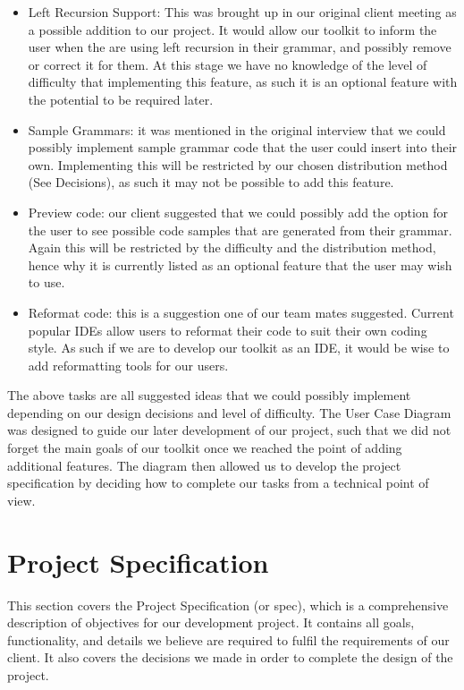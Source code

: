 \begin {itemize}
	\item Left Recursion Support: This was brought up in our original client meeting as a possible addition to our project. It would allow our toolkit to inform the user when the are using left recursion in their grammar, and possibly remove or correct it for them. At this stage we have no knowledge of the level of difficulty that implementing this feature, as such it is an optional feature with the potential to be required later.
	\item Sample Grammars: it was mentioned in the original interview that we could possibly implement sample grammar code that the user could insert into their own. Implementing this will be restricted by our chosen distribution method (See Decisions), as such it may not be possible to add this feature.
	\item Preview code: our client suggested that we could possibly add the option for the user to see possible code samples that are generated from their grammar. Again this will be restricted by the difficulty and the distribution method, hence why it is currently listed as an optional feature that the user may wish to use.
	\item Reformat code: this is a suggestion one of our team mates suggested. Current popular IDEs allow users to reformat their code to suit their own coding style. As such if we are to develop our toolkit as an IDE, it would be wise to add reformatting tools for our users.
\end {itemize}

The above tasks are all suggested ideas that we could possibly implement depending on our design decisions and level of difficulty. The User Case Diagram was designed to guide our later development of our project, such that we did not forget the main goals of our toolkit once we reached the point of adding additional features. The diagram then allowed us to develop the project specification by deciding how to complete our tasks from a technical point of view.

\section{Project Specification}
This section covers the Project Specification (or spec), which is a comprehensive description of objectives for our development project. It contains all goals, functionality, and details we believe are required to fulfil the requirements of our client. It also covers the decisions we made in order to complete the design of the project. \\
\\
